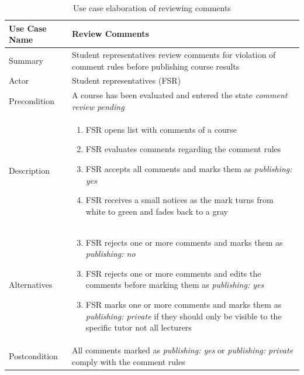 \begin{table}[]
    \centering
    \label{tab:use-case}
    \begin{tabularx}{\textwidth}{|l|X|}
        \hline
        Use Case Name                      
            & Review Comments       \\ \hline 
        Summary                           
            & Student representatives review comments for violation of comment rules before publishing course results                \\ \hline
        Actor 
            & Student representatives (FSR)         \\ \hline
        Precondition          
            & A course has been evaluated and entered the state \emph{comment review pending} \\ \hline
        Description               
            & 	\begin{enumerate}
                    \item FSR opens list with comments of a course
                    \item FSR evaluates comments regarding the comment rules
                    \item FSR accepts all comments and marks them as \emph{publishing: yes}
                    \item FSR receives a small notices as the mark turns from white to green and fades back to a gray
                \end{enumerate}          \\ \hline
        Alternatives                 
            & 	\begin{enumerate}
                    \setcounter{enumi}{2}
                    \item FSR rejects one or more comments and marks them as \emph{publishing: no}
                \end{enumerate}
                \begin{enumerate}
                    \setcounter{enumi}{2}
                    \item FSR rejects one or more comments  and edits the comments before marking them as \emph{publishing: yes}
                \end{enumerate}
                \begin{enumerate}
                    \setcounter{enumi}{2}
                    \item FSR marks one or more comments and marks them as \emph{publishing: private} if they should only be visible to the specific tutor not all lecturers
                \end{enumerate}     \\ \hline
        Postcondition        
            & All comments marked as \emph{publishing: yes} or \emph{publishing: private} comply with the comment rules         \\ \hline
    \end{tabularx}
    \caption{Use case elaboration of reviewing comments}
\end{table}

